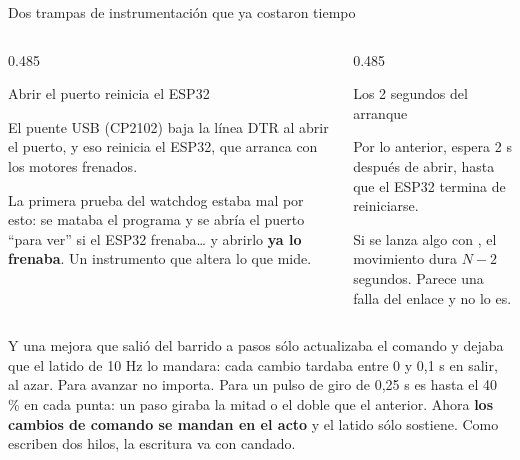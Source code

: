 \begin{frame}{Dos trampas de instrumentación que ya costaron tiempo}
  \begin{columns}[T,onlytextwidth]
    \begin{column}{0.485\textwidth}
      \begin{alertblock}{Abrir el puerto reinicia el ESP32}
        {\small El puente USB (CP2102) baja la línea DTR al abrir el puerto, y
        eso reinicia el ESP32, que arranca con los motores frenados.

        La primera prueba del watchdog estaba mal por esto: se mataba el
        programa y se abría el puerto ``para ver'' si el ESP32 frenaba\dots{}
        y abrirlo \textbf{ya lo frenaba}. Un instrumento que altera lo que
        mide.}
      \end{alertblock}
    \end{column}
    \begin{column}{0.485\textwidth}
      \begin{alertblock}{Los 2 segundos del arranque}
        {\small Por lo anterior,  espera 2 s después de abrir, hasta
        que el ESP32 termina de reiniciarse.

        Si se lanza algo con , el movimiento dura $N - 2$
        segundos. Parece una falla del enlace y no lo es.}
      \end{alertblock}
    \end{column}
  \end{columns}

  \vspace{0.5em}
  \begin{block}{Y una mejora que salió del barrido a pasos}
    {\small {} sólo actualizaba el comando y dejaba que el latido de 10 Hz
    lo mandara: cada cambio tardaba entre 0 y 0,1 s en salir, al azar. Para
    avanzar no importa. Para un pulso de giro de 0,25 s es hasta el 40 \% en
    cada punta: un paso giraba la mitad o el doble que el anterior. Ahora
    \textbf{los cambios de comando se mandan en el acto} y el latido sólo
    sostiene. Como escriben dos hilos, la escritura va con candado.}
  \end{block}
\end{frame}
